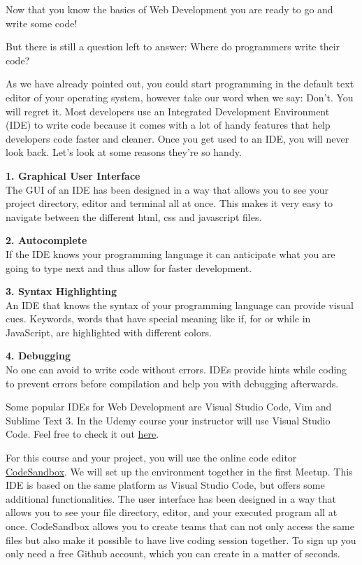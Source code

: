 \documentclass[
]{article}
\begin{document}
Now that you know the basics of Web Development you are ready to go and write some code!

But there is still a question left to answer: Where do programmers write their code?

As we have already pointed out, you could start programming in the default text editor of your operating system, however take our word when we say: Don't. You will regret it. Most developers use an Integrated Development Environment (IDE) to write code because it comes with a lot of handy features that help developers code faster and cleaner. Once you get used to an IDE, you will never look back. Let's look at some reasons they're so handy.

\textbf{1. Graphical User Interface}\\
The GUI of an IDE has been designed in a way that allows you to see your project directory, editor and terminal all at once. This makes it very easy to navigate between the different html, css and javascript files.

\textbf{2. Autocomplete}\\
If the IDE knows your programming language it can anticipate what you are going to type next and thus allow for faster development.

\textbf{3. Syntax Highlighting}\\
An IDE that knows the syntax of your programming language can provide visual cues. Keywords, words that have special meaning like if, for or while in JavaScript, are highlighted with different colors.

\textbf{4. Debugging}\\
No one can avoid to write code without errors. IDEs provide hints while coding to prevent errors before compilation and help you with debugging afterwards.

Some popular IDEs for Web Development are Visual Studio Code, Vim and Sublime Text 3. In the Udemy course your instructor will use Visual Studio Code. Feel free to check it out \href{https://code.visualstudio.com/}{here}.

For this course and your project, you will use the online code editor \href{https://codesandbox.io/}{CodeSandbox}. We will set up the environment together in the first Meetup. This IDE is based on the same platform as Visual Studio Code, but offers some additional functionalities. The user interface has been designed in a way that allows you to see your file directory, editor, and your executed program all at once. CodeSandbox allows you to create teams that can not only access the same files but also make it possible to have live coding session together. To sign up you only need a free Github account, which you can create in a matter of seconds.
\end{document}
